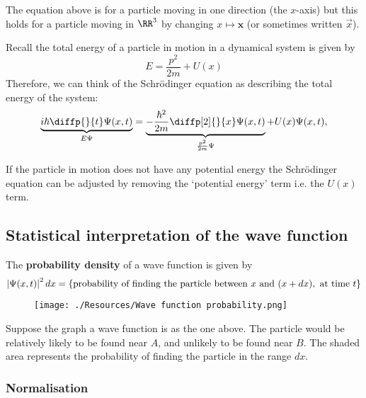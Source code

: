 \documentclass[12pt, a4paper]{article}
\begin{document}
\begin{mdremark}
    The equation above is for a particle moving in one direction (the \(x\)-axis) but this holds for a particle moving in \(\RR^3\) by changing \(x \mapsto \bm{x}\) (or sometimes written \(\vec{x}\)).
\end{mdremark}

\begin{mdnote}
    Recall the total energy of a particle in motion in a dynamical system is given by 
    \[E = \frac{p^2}{2m} +U(x)\]
    Therefore, we can think of the Schrödinger equation as describing the total energy of the system: 
    \[\underbrace{i \hbar \diffp{}{t} \Psi(x,t)}_{E\Psi} = \underbrace{- \frac{\hbar^2}{2m} \diffp[2]{}{x}\Psi(x,t)}_{\frac{p^2}{2m} \Psi} + U(x)\Psi(x,t),\]
\end{mdnote}

\begin{mdremark}
    If the particle in motion does not have any potential energy the Schrödinger equation can be adjusted by removing the `potential energy' term i.e. the \(U(x)\) term.
\end{mdremark}

\subsection{Statistical interpretation of the wave function}

\begin{mdthm}
    The \textbf{probability density} of a wave function is given by
    \[\abs{\Psi(x,t)}^2 \, dx = \{\text{probability of finding the particle between } x \text{ and } (x+dx), \text{ at time } t\}\]
\end{mdthm}

\begin{figure}[H]
     \begin{center}
         \texttt{[image: ./Resources/Wave function probability.png]}
     \end{center}
\end{figure}

Suppose the graph a wave function is as the one above. The particle would be relatively likely to be found near \(A\), and unlikely to be found near \(B\). The shaded area represents the probability of finding the particle in the range \(dx\).

\subsubsection{Normalisation}
\end{document}
